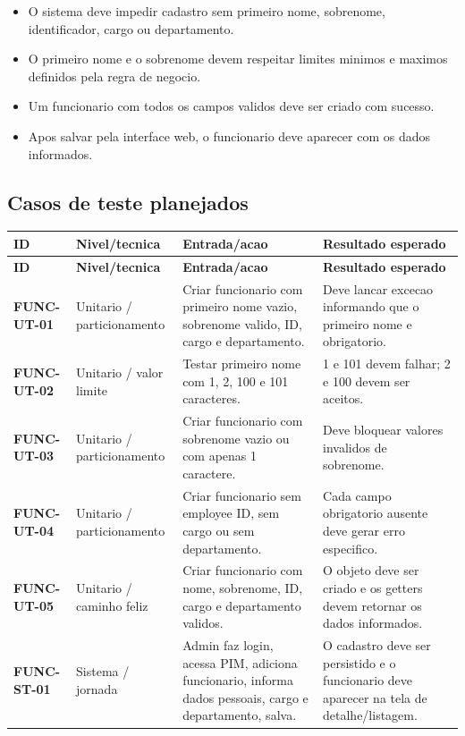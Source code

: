 \documentclass[12pt,a4paper]{article}
\newcommand{\Caso}[1]{\textbf{#1}}
\begin{document}
\begin{itemize}
    \item O sistema deve impedir cadastro sem primeiro nome, sobrenome, identificador, cargo ou departamento.
    \item O primeiro nome e o sobrenome devem respeitar limites minimos e maximos definidos pela regra de negocio.
    \item Um funcionario com todos os campos validos deve ser criado com sucesso.
    \item Apos salvar pela interface web, o funcionario deve aparecer com os dados informados.
\end{itemize}

\newpage
\subsection{Casos de teste planejados}

\begin{longtable}{p{2.4cm}p{2.9cm}p{4.5cm}p{4.6cm}}
\toprule
\textbf{ID} & \textbf{Nivel/tecnica} & \textbf{Entrada/acao} & \textbf{Resultado esperado} \\
\midrule
\endfirsthead
\toprule
\textbf{ID} & \textbf{Nivel/tecnica} & \textbf{Entrada/acao} & \textbf{Resultado esperado} \\
\midrule
\endhead
\Caso{FUNC-UT-01} & Unitario / particionamento & Criar funcionario com primeiro nome vazio, sobrenome valido, ID, cargo e departamento. & Deve lancar excecao informando que o primeiro nome e obrigatorio. \\
\Caso{FUNC-UT-02} & Unitario / valor limite & Testar primeiro nome com 1, 2, 100 e 101 caracteres. & 1 e 101 devem falhar; 2 e 100 devem ser aceitos. \\
\Caso{FUNC-UT-03} & Unitario / particionamento & Criar funcionario com sobrenome vazio ou com apenas 1 caractere. & Deve bloquear valores invalidos de sobrenome. \\
\Caso{FUNC-UT-04} & Unitario / particionamento & Criar funcionario sem employee ID, sem cargo ou sem departamento. & Cada campo obrigatorio ausente deve gerar erro especifico. \\
\Caso{FUNC-UT-05} & Unitario / caminho feliz & Criar funcionario com nome, sobrenome, ID, cargo e departamento validos. & O objeto deve ser criado e os getters devem retornar os dados informados. \\
\Caso{FUNC-ST-01} & Sistema / jornada & Admin faz login, acessa PIM, adiciona funcionario, informa dados pessoais, cargo e departamento, salva. & O cadastro deve ser persistido e o funcionario deve aparecer na tela de detalhe/listagem. \\
\bottomrule
\end{longtable}
\end{document}
